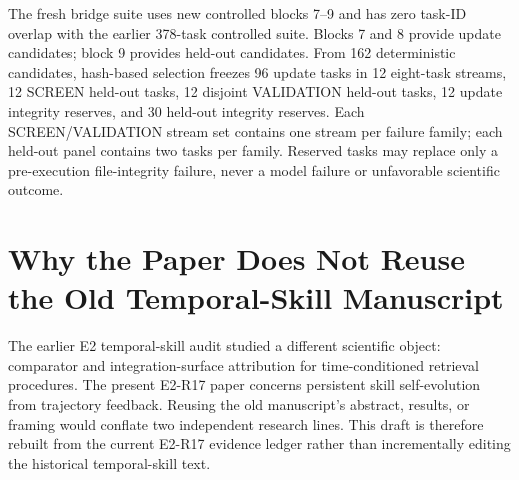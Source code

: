 The fresh bridge suite uses new controlled blocks 7--9 and has zero task-ID overlap with the earlier 378-task controlled suite. Blocks 7 and 8 provide update candidates; block 9 provides held-out candidates. From 162 deterministic candidates, hash-based selection freezes 96 update tasks in 12 eight-task streams, 12 SCREEN held-out tasks, 12 disjoint VALIDATION held-out tasks, 12 update integrity reserves, and 30 held-out integrity reserves. Each SCREEN/VALIDATION stream set contains one stream per failure family; each held-out panel contains two tasks per family. Reserved tasks may replace only a pre-execution file-integrity failure, never a model failure or unfavorable scientific outcome.

\section{Why the Paper Does Not Reuse the Old Temporal-Skill Manuscript}
The earlier E2 temporal-skill audit studied a different scientific object: comparator and integration-surface attribution for time-conditioned retrieval procedures. The present E2-R17 paper concerns persistent skill self-evolution from trajectory feedback. Reusing the old manuscript's abstract, results, or framing would conflate two independent research lines. This draft is therefore rebuilt from the current E2-R17 evidence ledger rather than incrementally editing the historical temporal-skill text.
